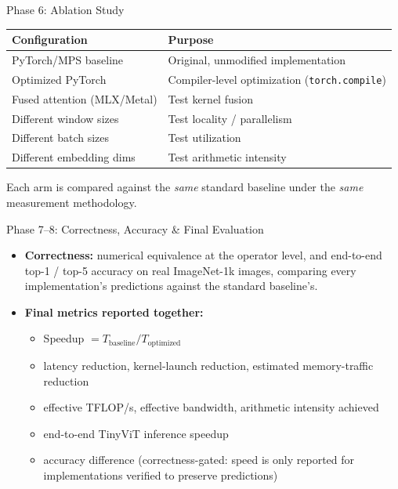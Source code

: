 \documentclass[aspectratio=169]{beamer}
\begin{document}
\begin{frame}{Phase 6: Ablation Study}
  \begin{table}
    \centering
    \small
    \begin{tabular}{ll}
      \toprule
      \textbf{Configuration} & \textbf{Purpose} \\
      \midrule
      PyTorch/MPS baseline        & Original, unmodified implementation \\
      Optimized PyTorch           & Compiler-level optimization (\texttt{torch.compile}) \\
      Fused attention (MLX/Metal) & Test kernel fusion \\
      Different window sizes      & Test locality / parallelism \\
      Different batch sizes       & Test utilization \\
      Different embedding dims    & Test arithmetic intensity \\
      \bottomrule
    \end{tabular}
  \end{table}
  \vspace{2mm}
  Each arm is compared against the \emph{same} standard baseline under the \emph{same}
  measurement methodology.
\end{frame}

\begin{frame}{Phase 7--8: Correctness, Accuracy \& Final Evaluation}
  \begin{itemize}
    \item \textbf{Correctness:} numerical equivalence at the operator level, and end-to-end
      top-1 / top-5 accuracy on real ImageNet-1k images, comparing every implementation's
      predictions against the standard baseline's.
    \item \textbf{Final metrics reported together:}
    \begin{itemize}
      \item Speedup $= T_{\text{baseline}} / T_{\text{optimized}}$
      \item latency reduction, kernel-launch reduction, estimated memory-traffic reduction
      \item effective TFLOP/s, effective bandwidth, arithmetic intensity achieved
      \item end-to-end TinyViT inference speedup
      \item accuracy difference (correctness-gated: speed is only reported for implementations
        verified to preserve predictions)
    \end{itemize}
  \end{itemize}
\end{frame}
\end{document}

